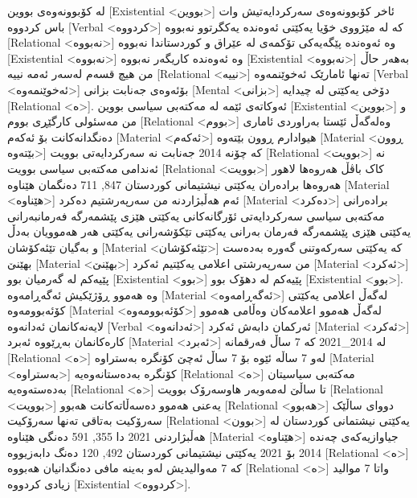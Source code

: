 لە کۆبوونەوەی بووین [Existential <بووین>] ئاخر کۆبوونەوەی سەرکردایەتیش وات باس کردووە [Verbal <کردووە>] کە لە مێژووی خۆیا یەکێتی ئەوەندە یەکگرتوو نەبووە [Relational <نەبووە>] وە ئەوەندە پێگەیەکی تۆکمەی لە عێراق و کوردستاندا نەبووە [Existential <نەبووە>] وە ئەوەندە کاریگەر نەبووە [Existential <نەبووە>] بەهەر حاڵ من هیچ قسەم لەسەر ئەمە نییە [Relational <نییە>] تەنها ئامارێک ئەخوێنمەوە [Verbal <ئەخوێنمەوە>] بۆئەوەی جەنابت بزانی [Mental <بزانی>] دۆخی یەکێتی لە چیدایە [Relational <ە>].
ئەوکاتەی ئێمە لە مەکتەبی سیاسی بووین [Existential <بووین>] و من مەسئولی کارگێڕی بووم [Relational <بووم>] وەلەگەڵ ئێستا بەراوردی ئاماری دەنگدانەکانت بۆ ئەکەم [Material <ئەکەم>] هیوادارم ڕوون بێتەوە [Material <ڕوون بێتەوە>] کە چۆنە 2014 جەنابت نە سەرکردایەتی بوویت [Relational <بوویت>] نە ئەندامی مەکتەبی سیاسی بوویت [Relational <بوویت>] کاک باڤڵ هەروەها لاهور هەروەها برادەران یەکێتی نیشتیمانی کوردستان 847, 711 دەنگمان هێناوە [Material <هێناوە>] ئەم هەڵبژاردنە من سەرپەرشتیم دەکرد [Material <دەکرد>] برادەرانی مەکتەبی سیاسی سەرکردایەتی ئۆرگانەکانی یەکێتی هێزی پێشمەرگە فەرمانبەرانی یەکێتی هێزی پێشمەرگە فەرمان بەرانی یەکێتی تێکۆشەرانی یەکێتی هەر هەموویان بەدڵ و بەگیان تێئەکۆشان [Material <تێئەکۆشان>] کە یەکێتی سەرکەوتنی گەورە بەدەست بهێنێ [Material <بهێنێ>] من سەرپەرشتی اعلامی یەکێتیم ئەکرد [Material <ئەکرد>] پێیەکم لە گەرمیان بوو [Existential <بوو>] پێیەکم لە دهۆک بوو [Existential <بوو>].
وە هەموو ڕۆژێکیش ئەگەڕامەوە [Material <ئەگەڕامەوە>] لەگەڵ اعلامی یەکێتی کۆئەبوومەوە [Material <کۆئەبوومەوە>] لەگەڵ هەموو اعلامەکان وەڵامی هەموو لایەنەکانمان ئەدانەوە [Verbal <ئەدانەوە>] ئەرکمان دابەش ئەکرد [Material <ئەکرد>] کارەکانمان بەڕێووە ئەبرد [Material <ئەبرد>] لە 2014_2021 کە 7 ساڵ فەرقمانە [Relational <ە>] لەو 7 ساڵە ئێوە بۆ 7 ساڵ ئەچێ کۆنگرە بەستراوە [Material <بەستراوە>] کۆنگرە بەدەستانەوەیە [Relational <ە>] مەکتەبی سیاسیتان بەدەستەوەیە [Relational <ە>] تا ساڵێ لەمەوبەر هاوسەرۆک بوویت [Relational <بوویت>] یەعنی هەموو دەسەڵاتەکانت هەبوو [Relational <هەبوو>] دووای ساڵێک سەرۆکیت بەتاقی تەنها سەرۆکیت [Relational <بوون>] یەکێتی نیشتمانی کوردستان لە هەڵبژاردنی 2021 دا 355, 591 دەنگی هێناوە [Material <هێناوە>] جیاوازیەکەی چەندە 2014 بۆ 2021 یەکێتی نیشتیمانی کوردستان 492, 120 دەنگ دابەزیووە [Relational <ە>] کە 7 مەوالیدیش لەو بەینە مافی دەنگدانیان هەبووە [Relational <ە>] واتا 7 موالید زیادی کردووە [Existential <کردووە>].
